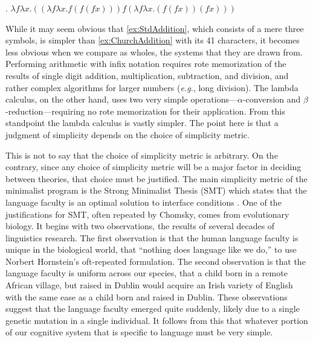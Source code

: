 \documentclass[MilwayThesis]{subfiles}
\begin{document}
\ex.\label{ex:ChurchAddition} $\lambda f \lambda x . ((\lambda f \lambda x . f(f(f x))) f(\lambda f \lambda x . (f(f x))(f x)))$

While it may seem obvious that \cref{ex:StdAddition}, which consists of a mere three symbols, is simpler than \cref{ex:ChurchAddition} with its 41 characters, it becomes less obvious when we compare as wholes, the systems that they are drawn from.
Performing arithmetic with infix notation requires rote memorization of the results of single digit addition, multiplication, subtraction, and division, and rather complex algorithms for larger numbers (\textit{e.g.}, long division).
The lambda calculus, on the other hand, uses two very simple operations---$\alpha$-conversion and $\beta$-reduction---requiring no rote memorization for their application.
From this standpoint the lambda calculus is vastly simpler.
The point here is that a judgment of simplicity depends on the choice of simplicity metric.

This is not to say that the choice of simplicity metric is arbitrary.
On the contrary, since any choice of simplicity metric will be a major factor in deciding between theories, that choice must be justified.
The main simplicity metric of the minimalist program is the Strong Minimalist Thesis (SMT) which states that the language faculty is an optimal solution to interface conditions \parencite{chomsky2001derivation}.
One of the justifications for SMT, often repeated by Chomsky, comes from evolutionary biology.
It begins with two observations, the results of several decades of linguistics research.
The first observation is that the human language faculty is unique in the biological world, that ``nothing does language like we do,'' to use Norbert Hornstein's oft-repeated formulation.
The second observation is that the language faculty is uniform across our species, that a child born in a remote African village, but raised in Dublin would acquire an Irish variety of English with the same ease as a child born and raised in Dublin.
These observations suggest that the language faculty emerged quite suddenly, likely due to a single genetic mutation in a single individual.
It follows from this that whatever portion of our cognitive system that is specific to language must be very simple.
\end{document}
